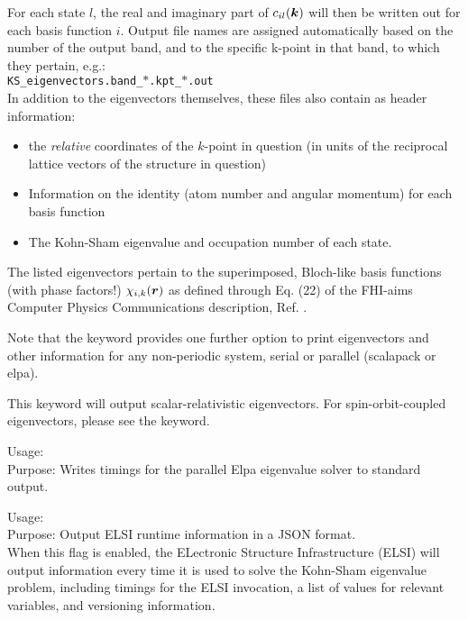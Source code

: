 For each state $l$, the real and imaginary part of
$c_{il}(\mbox{\boldmath$k$})$ will then be written out for each basis function
$i$. Output file names are assigned automatically based on the number of the
output band, and to the specific k-point in that band, to which they pertain,
e.g.:
\\[1.0ex]
\texttt{KS\_eigenvectors.band\_$\ast$.kpt\_$\ast$.out} \\[1.0ex]
In addition to the eigenvectors themselves, these files also contain as header
information:\\[-2.0ex]
\begin{itemize}
  \item the \emph{relative} coordinates of the $k$-point in question (in
    units of the reciprocal lattice vectors of the structure in question) \\[-2.0ex]
  \item Information on the identity (atom number and angular momentum) for
    each basis function \\[-2.0ex]
  \item The Kohn-Sham eigenvalue and occupation number of each state. \\[-2.0ex]
\end{itemize}
The listed eigenvectors pertain to the superimposed, Bloch-like basis
functions (with phase factors!) $\chi_{i,k}(\mbox{\boldmath$r$})$ as defined
through Eq. (22) of the FHI-aims Computer Physics Communications description,
Ref. \cite{Blum08}.

Note that the   keyword
provides one further option to print eigenvectors and other
information for any non-periodic system, serial or parallel (scalapack
or elpa).

This keyword will output scalar-relativistic eigenvectors.  For spin-orbit-coupled
eigenvectors, please see the  keyword.


{
  \noindent
  Usage:    \\[1.0ex]
  Purpose: Writes timings for the parallel Elpa eigenvalue solver to standard
  output.  \\
}

{
  \noindent
  Usage:    \\[1.0ex]
  Purpose: Output ELSI runtime information in a JSON format. \\
}
When this flag is enabled, the ELectronic Structure Infrastructure
(ELSI) will output information every time it is used to solve the Kohn-Sham
eigenvalue problem, including timings for the ELSI invocation, a list of
values for relevant variables, and versioning information.

